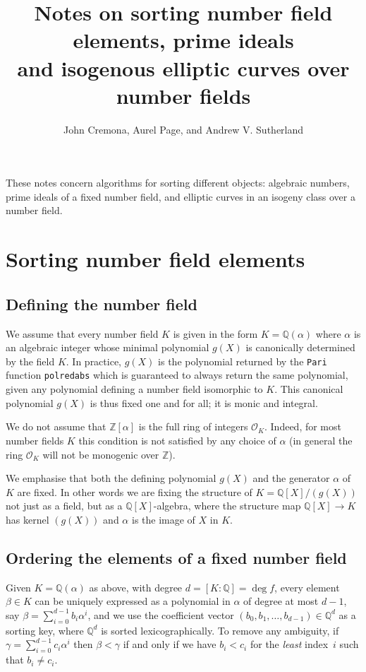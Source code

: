 \documentclass{article}
\title{Notes on sorting number field elements, prime ideals\\and
  isogenous elliptic curves over number fields}
\author{John Cremona, Aurel Page, and Andrew V. Sutherland}
\def\Z{{\mathbb Z}}
\def\Q{{\mathbb Q}}
\def\OO{{\mathcal O}}
\begin{document}
\maketitle

These notes concern algorithms for sorting different objects:
algebraic numbers, prime ideals of a fixed number field, and elliptic
curves in an isogeny class over a number field.

\section{Sorting number field elements}
\subsection{Defining the number field}
We assume that every number field $K$ is given in the form
$K=\Q(\alpha)$ where $\alpha$ is an algebraic integer whose
minimal polynomial $g(X)$ is canonically determined by the field $K$.
In practice, $g(X)$ is the
polynomial returned by the {\tt Pari} function {\tt polredabs} which
is guaranteed to always return the same polynomial, given any
polynomial defining a number field isomorphic to $K$.  This canonical
polynomial $g(X)$ is thus fixed one and for all; it is monic and
integral.

We do not assume that $\Z[\alpha]$ is the full ring of integers
$\OO_K$.  Indeed, for most number fields $K$ this condition is
not satisfied by any choice of $\alpha$ (in general the ring $\OO_K$
will not be monogenic over $\Z$).

We emphasise that both the defining polynomial $g(X)$ and the generator
$\alpha$ of~$K$ are fixed.  In other words we are fixing the structure
of $K=\Q[X]/(g(X))$ not just as a field, but as a $\Q[X]$-algebra, where the
structure map $\Q[X]\to K$ has kernel $(g(X))$ and $\alpha$ is the
image of $X$ in $K$.

\subsection{Ordering the elements of a fixed number field}\label{sec:ordfix}
Given $K=\Q(\alpha)$ as above, with degree $d=[K:\Q]=\deg f$, every
element $\beta\in K$ can be uniquely expressed as a polynomial in
$\alpha$ of degree at most $d-1$, say
$\beta=\sum_{i=0}^{d-1}b_i\alpha^i$, and we use the coefficient vector
$(b_0,b_1,\dots,b_{d-1})\in\Q^d$ as a sorting key, where $\Q^d$ is
sorted lexicographically.  To remove any ambiguity, if
$\gamma=\sum_{i=0}^{d-1}c_i\alpha^i$ then $\beta<\gamma$ if and only
if we have $b_i<c_i$ for the \textit{least} index~$i$ such that $b_i\not=c_i$.
\end{document}
